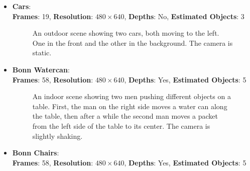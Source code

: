 \begin{itemize}
\item \textbf{Cars}: \\ 
\textbf{Frames}: 19, \textbf{Resolution}: $480 \times 640$, \textbf{Depths}: No, \textbf{Estimated Objects}: 3
\begin{figure}[H]
\begin{center}
\end{center}
\caption[Dataset Bonn Cars]{An outdoor scene showing two cars, both moving to the left. One in the front and the other in the background. The camera is static.}
\label{fig:eval_datasets_cars}
\end{figure}
\item \textbf{Bonn Watercan}: \\
\textbf{Frames}: 58, \textbf{Resolution}: $480 \times 640$, \textbf{Depths}: Yes, \textbf{Estimated Objects}: 5
\begin{figure}[H]
\begin{center}
\end{center}
\caption[Dataset Bonn Watercan]{An indoor scene showing two men pushing different objects on a table. First, the man on the right side moves a water can along the table, then after a while the second man moves a packet from the left side of the table to its center. The camera is slightly shaking.}
\label{fig:eval_datasets_bonn_watercan}
\end{figure}
\item \textbf{Bonn Chairs}: \\
\textbf{Frames}: 58, \textbf{Resolution}: $480 \times 640$, \textbf{Depths}: Yes, \textbf{Estimated Objects}: 5
\begin{figure}[H]
\begin{center}

\end{center}
\end{figure}
\end{itemize}
